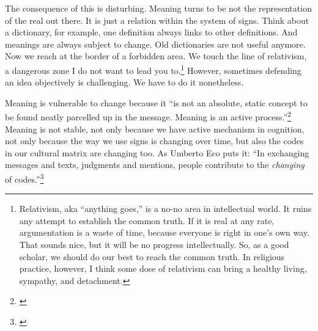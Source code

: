 The consequence of this is disturbing. Meaning turns to be not the representation of the real out there. It is just a relation within the system of signs. Think about a dictionary, for example, one definition always links to other definitions. And meanings are always subject to change. Old dictionaries are not useful anymore. Now we reach at the border of a forbidden area. We touch the line of relativism, a dangerous zone I do not want to lead you to.\footnote{Relativism, aka ``anything goes,'' is a no-no area in intellectual world. It ruins any attempt to establish the common truth. If it is real at any rate, argumentation is a waste of time, because everyone is right in one's own way. That sounds nice, but it will be no progress intellectually. So, as a good scholar, we should do our best to reach the common truth. In religious practice, however, I think some dose of relativism can bring a healthy living, sympathy, and detachment.} However, sometimes defending an idea objectively is challenging. We have to do it nonetheless.

Meaning is vulnerable to change because it ``is not an absolute, static concept to be found neatly parcelled up in the message. Meaning
is an active process.''\footnote{\citealp[p.~46]{fiske:communication}} Meaning is not stable, not only because we have active mechanism in cognition, not only because the way we use signs is changing over time, but also the codes in our cultural matrix are changing too. As Umberto Eco puts it: ``In exchanging messages and texts, judgments and mentions, people contribute to the \emph{changing} of codes.''\footnote{\citealp[p.~152]{eco:semiotics}}
